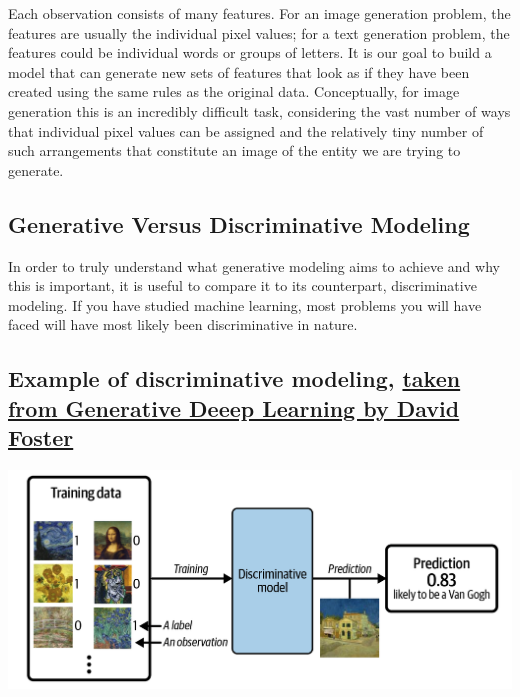 \documentclass[%
oneside,                 %
final,                   %
10pt]{article}
\begin{document}
Each observation consists of many features. For an image generation
problem, the features are usually the individual pixel values; for a
text generation problem, the features could be individual words or
groups of letters. It is our goal to build a model that can generate
new sets of features that look as if they have been created using the
same rules as the original data. Conceptually, for image generation
this is an incredibly difficult task, considering the vast number of
ways that individual pixel values can be assigned and the relatively
tiny number of such arrangements that constitute an image of the
entity we are trying to generate.

\subsection{Generative Versus Discriminative Modeling}

In order to truly understand what generative modeling aims to achieve
and why this is important, it is useful to compare it to its
counterpart, discriminative modeling. If you have studied machine
learning, most problems you will have faced will have most likely been
discriminative in nature. 

\subsection{Example of discriminative modeling, \href{{https://www.oreilly.com/library/view/generative-deep-learning/9781098134174/ch01.html}}{taken from Generative Deeep Learning by David Foster}}

\vspace{6mm}

\centerline{\includegraphics[width=1.0\linewidth]{figures/standarddeeplearning.png}}

\vspace{6mm}
\end{document}
